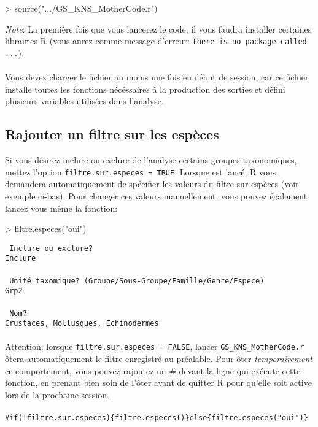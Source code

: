 \documentclass{article}
\begin{document}
\begin{Schunk}
\begin{Sinput}
> source(".../GS_KNS_MotherCode.r")
\end{Sinput}
\end{Schunk}

\emph{Note}: La première fois que vous lancerez le code, il vous
faudra installer certaines librairies R (vous aurez comme message d'erreur:
\texttt{there is no package called ...}). \\
\\

 Vous devez charger le fichier \mcode {} au moins
une fois en début de session, car ce fichier installe toutes les fonctions nécéssaires à la production des
sorties et défini plusieurs
variables utilisées dans l'analyse.

\subsection*{Rajouter un filtre sur les espèces}
\label{filtre::sp}
Si vous désirez inclure ou exclure de l'analyse certains groupes
taxonomiques, mettez l'option \texttt{filtre.sur.especes =
  TRUE}. Lorsque \mcode {} est lancé, R vous
demandera automatiquement de spécifier les valeurs du filtre sur
espèces (voir exemple ci-bas). Pour changer ces valeurs manuellement,
vous pouvez également lancez
vous même la fonction:

\begin{Schunk}
\begin{Sinput}
> filtre.especes("oui")
\end{Sinput}
\end{Schunk}

\texttt{\color{MidnightBlue} Inclure ou exclure? } \\
\indent \indent \texttt{Inclure } \\
\\
\indent \texttt{\color{MidnightBlue} Unité taxomique? (Groupe/Sous-Groupe/Famille/Genre/Espece)} \\
\indent \indent \texttt{Grp2}\\
\\
\indent \texttt{\color{MidnightBlue} Nom?} \\
\indent \indent \texttt{Crustaces, Mollusques, Echinodermes}\\
\\

\noindent Attention: lorsque \texttt{filtre.sur.especes =
  FALSE}, lancer \texttt{GS\_KNS\_MotherCode.r} ôtera automatiquement
le filtre enregistré au préalable. Pour ôter \emph{temporairement} ce comportement,
vous pouvez rajoutez un \# devant la ligne qui exécute cette fonction,
en prenant bien soin de l'ôter avant de quitter R pour qu'elle soit
active lors de la prochaine session. \\
\\
\texttt{\#if(!filtre.sur.especes)\{filtre.especes()\}else\{filtre.especes("oui")\}}
\end{document}
